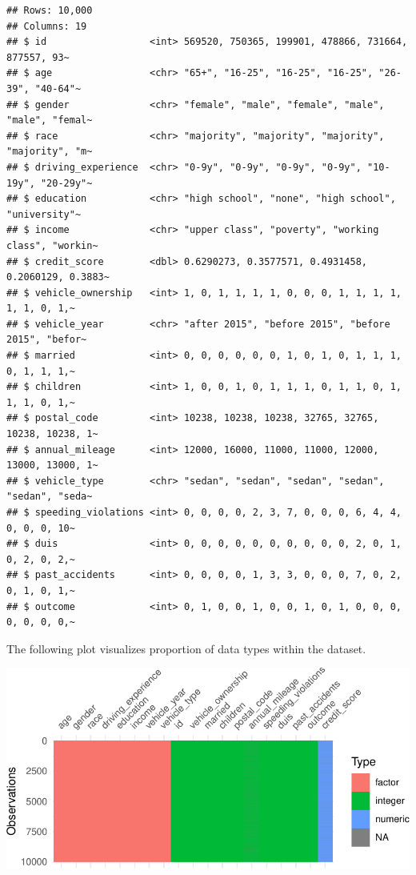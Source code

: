 \documentclass{article}
\begin{document}
\begin{verbatim}
## Rows: 10,000
## Columns: 19
## $ id                  <int> 569520, 750365, 199901, 478866, 731664, 877557, 93~
## $ age                 <chr> "65+", "16-25", "16-25", "16-25", "26-39", "40-64"~
## $ gender              <chr> "female", "male", "female", "male", "male", "femal~
## $ race                <chr> "majority", "majority", "majority", "majority", "m~
## $ driving_experience  <chr> "0-9y", "0-9y", "0-9y", "0-9y", "10-19y", "20-29y"~
## $ education           <chr> "high school", "none", "high school", "university"~
## $ income              <chr> "upper class", "poverty", "working class", "workin~
## $ credit_score        <dbl> 0.6290273, 0.3577571, 0.4931458, 0.2060129, 0.3883~
## $ vehicle_ownership   <int> 1, 0, 1, 1, 1, 1, 0, 0, 0, 1, 1, 1, 1, 1, 1, 0, 1,~
## $ vehicle_year        <chr> "after 2015", "before 2015", "before 2015", "befor~
## $ married             <int> 0, 0, 0, 0, 0, 0, 1, 0, 1, 0, 1, 1, 1, 0, 1, 1, 1,~
## $ children            <int> 1, 0, 0, 1, 0, 1, 1, 1, 0, 1, 1, 0, 1, 1, 1, 0, 1,~
## $ postal_code         <int> 10238, 10238, 10238, 32765, 32765, 10238, 10238, 1~
## $ annual_mileage      <int> 12000, 16000, 11000, 11000, 12000, 13000, 13000, 1~
## $ vehicle_type        <chr> "sedan", "sedan", "sedan", "sedan", "sedan", "seda~
## $ speeding_violations <int> 0, 0, 0, 0, 2, 3, 7, 0, 0, 0, 6, 4, 4, 0, 0, 0, 10~
## $ duis                <int> 0, 0, 0, 0, 0, 0, 0, 0, 0, 0, 2, 0, 1, 0, 2, 0, 2,~
## $ past_accidents      <int> 0, 0, 0, 0, 1, 3, 3, 0, 0, 0, 7, 0, 2, 0, 1, 0, 1,~
## $ outcome             <int> 0, 1, 0, 0, 1, 0, 0, 1, 0, 1, 0, 0, 0, 0, 0, 0, 0,~
\end{verbatim}

\normalsize

The following plot visualizes proportion of data types within the
dataset.

\begin{center}\includegraphics{report_files/figure-latex/unnamed-chunk-3-1} \end{center}
\end{document}
